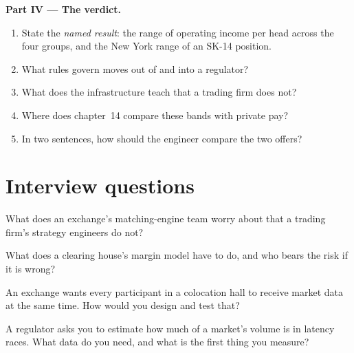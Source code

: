 \begin{problem}
\medskip\noindent\textbf{Part IV --- The verdict.}
\begin{enumerate}[resume]
\item State the \emph{named result}: the range of operating income per head across the four groups, and the New York
range of an SK-14 position.
\item What rules govern moves out of and into a regulator?
\item What does the infrastructure teach that a trading firm does not?
\item Where does chapter~14 compare these bands with private pay?
\item In two sentences, how should the engineer compare the two offers?
\end{enumerate}
\end{problem}

\section{Interview questions}

\begin{interviewq}\label{iq:in:exchanges-brokers-vendors-and-regulators-as-employers:1}
What does an exchange's matching-engine team worry about that a trading firm's strategy engineers do not?
\end{interviewq}

\begin{interviewq}\label{iq:in:exchanges-brokers-vendors-and-regulators-as-employers:2}
What does a clearing house's margin model have to do, and who bears the risk if it is wrong?
\end{interviewq}

\begin{interviewq}\label{iq:in:exchanges-brokers-vendors-and-regulators-as-employers:3}
An exchange wants every participant in a colocation hall to receive market data at the same time. How would you design
and test that?
\end{interviewq}

\begin{interviewq}\label{iq:in:exchanges-brokers-vendors-and-regulators-as-employers:4}
A regulator asks you to estimate how much of a market's volume is in latency races. What data do you need, and what is
the first thing you measure?
\end{interviewq}

